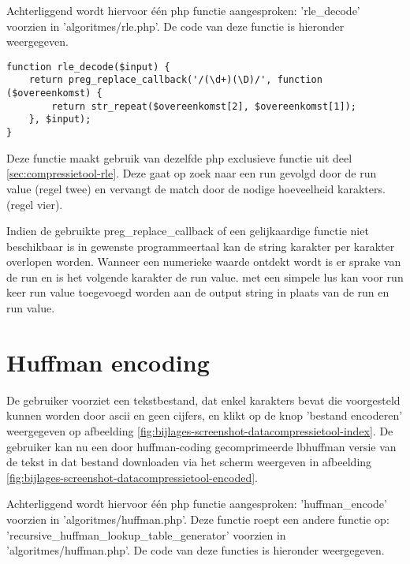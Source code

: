 Achterliggend wordt hiervoor één \gls{php} functie aangesproken: 'rle\_decode' voorzien in 'algoritmes/rle.php'. De code van deze functie is hieronder weergegeven.

\begin{lstlisting}
function rle_decode($input) {
	return preg_replace_callback('/(\d+)(\D)/', function ($overeenkomst) {
		return str_repeat($overeenkomst[2], $overeenkomst[1]);
	}, $input);
}
\end{lstlisting}

Deze functie maakt gebruik van dezelfde \gls{php} exclusieve functie uit deel \ref{sec:compressietool-rle}. Deze gaat op zoek naar een run gevolgd door de run value (regel twee) en vervangt de match door de nodige hoeveelheid karakters. (regel vier).

Indien de gebruikte preg\_replace\_callback of een gelijkaardige functie niet beschikbaar is in gewenste programmeertaal kan de \gls{string} karakter per karakter overlopen worden. Wanneer een numerieke waarde ontdekt wordt is er sprake van de run en is het volgende karakter de run value. met een simpele lus kan voor run keer run value toegevoegd worden aan de output string in plaats van de run en run value.

\section{Huffman encoding}
\label{sec:compressietool-huffman-encoding}

De gebruiker voorziet een tekstbestand, dat enkel karakters bevat die voorgesteld kunnen worden door \gls{ascii} en geen cijfers, en klikt op de knop 'bestand encoderen' weergegeven op afbeelding \ref{fig:bijlages-screenshot-datacompressietool-index}. De gebruiker kan nu een door \gls{huffman-coding} gecomprimeerde \gls{lbhuffman} versie van de tekst in dat bestand downloaden via het scherm weergeven in afbeelding \ref{fig:bijlages-screenshot-datacompressietool-encoded}.

Achterliggend wordt hiervoor één \gls{php} functie aangesproken: 'huffman\_encode' voorzien in 'algoritmes/huffman.php'. Deze functie roept een andere functie op: 'recursive\_huffman\_lookup\_table\_generator' voorzien in 'algoritmes/huffman.php'.  De code van deze functies is hieronder weergegeven.

